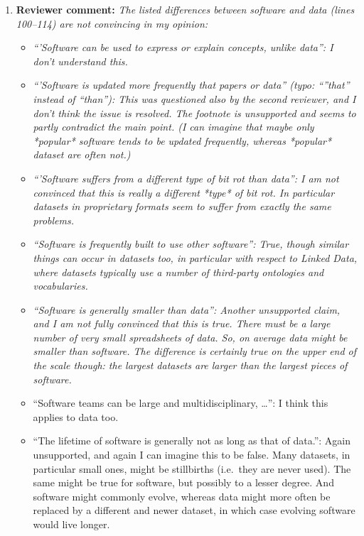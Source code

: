 \documentclass{article}
\begin{document}
\begin{enumerate}

\item \textbf{Reviewer comment:}
\emph{The listed differences between software and data (lines 100--114) are not
convincing in my opinion:}

\begin{itemize}

\item \emph{``'Software can be used to express or explain concepts, unlike
data'': I don't understand this.}

\item \emph{``'Software is updated more frequently that papers or data''
(typo: ``''that'' instead of ``than''): This was questioned also by the
second reviewer, and I don't think the issue is resolved. The footnote is
unsupported and seems to partly contradict the main point. (I can imagine that
maybe only *popular* software tends to be updated frequently, whereas
*popular* dataset are often not.)}

\item \emph{``'Software suffers from a different type of bit rot than data'':
I am not convinced that this is really a different *type* of bit rot.
In particular datasets in proprietary formats seem to suffer from exactly the
same problems.}


\item \emph{``Software is frequently built to use other software'': True,
though similar things can occur in datasets too, in particular with respect to
Linked Data, where datasets typically use a number of third-party ontologies and
vocabularies.}


\item \emph{``Software is generally smaller than data'': Another unsupported
claim, and I am not fully convinced that this is true. There must be a large
number of very small spreadsheets of data. So, on average data might be smaller
than software. The difference is certainly true on the upper end of the scale
though: the largest datasets are larger than the largest pieces of software.}


\item{``Software teams can be large and multidisciplinary, \ldots'': I think
this applies to data too.}


\item{``The lifetime of software is generally not as long as that of data.'':
Again unsupported, and again I can imagine this to be false. Many datasets, in
particular small ones, might be stillbirths (i.e.\ they are never used). The
same might be true for software, but possibly to a lesser degree. And software
might commonly evolve, whereas data might more often be replaced by a
different and newer dataset, in which case evolving software would live
longer.}


\end{itemize}
\end{enumerate}
\end{document}
